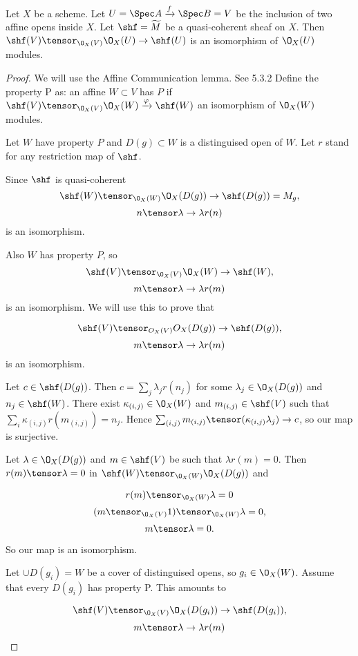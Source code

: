 \begin{question}
Let $X$ be a scheme.
Let $U=\Spec A \xrightarrow{f} \Spec B = V$ be the inclusion of two affine opens inside $X$.
Let $\shf=\widetilde{M}$ be a quasi-coherent sheaf on $X$. 
Then $\shf(V)\tensor_{\O_X(V)} \O_X(U) \rightarrow \shf(U)$ is an isomorphism of $\O_X(U)$ modules.
\end{question}

\begin{proof}
We will use the Affine Communication lemma. See \cite{vakil} 5.3.2
Define the property P as:
an affine $W\subset V$ has $P$ if $\shf(V)\tensor_{\O_X(V)} \O_X(W) \xrightarrow{\varphi} \shf(W)$ an isomorphism of $\O_X(W)$ modules.

Let $W$ have property $P$ and $D(g)\subset W$ is a distinguised open of $W$.
Let $r$ stand for any restriction map of $\shf$.

Since $\shf$ is quasi-coherent
\[\shf(W)\tensor_{\O_X(W)} \O_X(D(g)) \rightarrow \shf(D(g))= M_g,\]
\[ n \tensor \lambda \to \lambda r(n)\]
is an isomorphism.

Also $W$ has property $P$, so 
\[\shf(V)\tensor_{\O_X(V)} \O_X(W) \rightarrow \shf(W),\]
\[ m \tensor \lambda \to \lambda r(m)\]
is an isomorphism.
We will use this to prove that 

\[\shf(V)\tensor_{O_X(V)} O_X(D(g)) \rightarrow \shf(D(g)),\]
\[m \tensor \lambda \to \lambda r(m)\]
is an isomorphism.

Let $c \in \shf(D(g))$. 
Then $c= \sum_j \lambda_j r(n_j)$ for some $\lambda_j\in \O_X(D(g))$ and $n_j\in\shf(W)$.
There exist $\kappa_{(i,j)} \in \O_X(W)$ and $m_{(i,j)}\in \shf(V)$ such that $\sum_i \kappa_{(i,j)} r(m_{(i,j)})= n_j$.
Hence $\sum_{(i,j)} m_{(i,j)} \tensor (\kappa_{(i,j)}\lambda_j)\to c$, so our map is surjective.

Let $\lambda\in \O_X(D(g))$ and $m\in \shf(V)$ be such that $\lambda r(m)=0$.
Then $r(m) \tensor \lambda = 0$ in $\shf(W)\tensor_{\O_X(W)} \O_X(D(g))$ and

\[ r(m) \tensor_{\O_X(W)} \lambda = 0\]
\[(m\tensor_{\O_X(V)} 1) \tensor_{\O_X(W)} \lambda = 0,\]
\[ m\tensor \lambda = 0 .\]

So our map is an isomorphism.

Let $\cup D(g_i) = W$ be a cover of distinguised opens, so $g_i\in \O_X(W)$.
Assume that every $D(g_i)$ has property P.
This amounts to

\[\shf(V)\tensor_{\O_X(V)} \O_X(D(g_i)) \rightarrow \shf(D(g_i)),\]
\[m \tensor \lambda \to \lambda r(m)\]


\end{proof}
